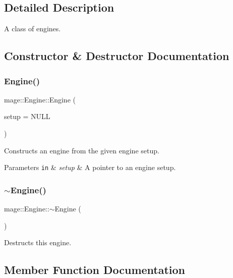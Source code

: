 \subsection{Detailed Description}
A class of engines. 

\subsection{Constructor \& Destructor Documentation}
\hypertarget{classmage_1_1_engine_a5b49f3adf1dd889bb38f5325fd6db317}{}\label{classmage_1_1_engine_a5b49f3adf1dd889bb38f5325fd6db317} 
\subsubsection{\texorpdfstring{Engine()}{Engine()}}
{\footnotesize\ttfamily mage\+::\+Engine\+::\+Engine (\begin{DoxyParamCaption}\item[{const \hyperlink{structmage_1_1_engine_setup}{Engine\+Setup} $\ast$}]{setup = {\ttfamily NULL} }\end{DoxyParamCaption})}

Constructs an engine from the given engine setup.


\begin{DoxyParams}[1]{Parameters}
\mbox{\tt in}  & {\em setup} & A pointer to an engine setup. \\
\hline
\end{DoxyParams}
\hypertarget{classmage_1_1_engine_a34628556f8397d70ed018d71e343c2f5}{}\label{classmage_1_1_engine_a34628556f8397d70ed018d71e343c2f5} 
\subsubsection{\texorpdfstring{$\sim$\+Engine()}{~Engine()}}
{\footnotesize\ttfamily mage\+::\+Engine\+::$\sim$\+Engine (\begin{DoxyParamCaption}{ }\end{DoxyParamCaption})\hspace{0.3cm}{\ttfamily [virtual]}}

Destructs this engine. 

\subsection{Member Function Documentation}
\hypertarget{classmage_1_1_engine_a55d099d040e8895803f15e214f3b6d9e}{}\label{classmage_1_1_engine_a55d099d040e8895803f15e214f3b6d9e} 
